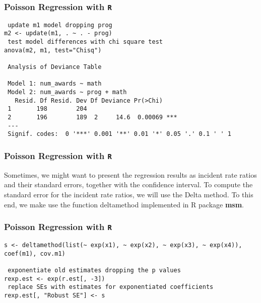 \documentclass[00-GLMregslides.tex]{subfiles}
\begin{document}
\begin{frame}[fragile]

\frametitle{Poisson Regression with \texttt{R}}
\Large

\begin{framed}
\begin{verbatim}
 update m1 model dropping prog
m2 <- update(m1, . ~ . - prog)
 test model differences with chi square test
anova(m2, m1, test="Chisq")
 
 Analysis of Deviance Table
 
 Model 1: num_awards ~ math
 Model 2: num_awards ~ prog + math
   Resid. Df Resid. Dev Df Deviance Pr(>Chi)    
 1       198        204                         
 2       196        189  2     14.6  0.00069 ***
 ---
 Signif. codes:  0 '***' 0.001 '**' 0.01 '*' 0.05 '.' 0.1 ' ' 1
\end{verbatim}
\end{framed}
\end{frame}

\begin{frame}[fragile]

\frametitle{Poisson Regression with \texttt{R}}
\Large 
Sometimes, we might want to present the regression results as incident rate ratios and their standard errors, together with the confidence interval. To compute the standard error for the incident rate ratios, we will use the Delta method. To this end, we make use the function deltamethod implemented in R package \textbf{msm}.

\end{frame}

\begin{frame}[fragile]

\frametitle{Poisson Regression with \texttt{R}}
\Large

\begin{framed}
\begin{verbatim}
s <- deltamethod(list(~ exp(x1), ~ exp(x2), ~ exp(x3), ~ exp(x4)), coef(m1), cov.m1)

 exponentiate old estimates dropping the p values
rexp.est <- exp(r.est[, -3])
 replace SEs with estimates for exponentiated coefficients
rexp.est[, "Robust SE"] <- s
\end{verbatim}
\end{framed}
\end{frame}
\end{document}
